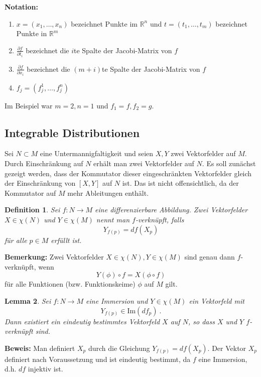\documentclass[12pt,a4paper]{article}
\def\R{\mathbb{R}}
\def\Im{\mathrm{Im}}
\newtheorem{Lemma}{Lemma}[section]
\newtheorem{Definition}[Lemma]{Definition}
\def\proof{\noindent\textbf{Beweis:}\quad}
\begin{document}
{\bf Notation:}
\begin{enumerate}
\item
$x=(x_1,\ldots, x_n)$ bezeichnet Punkte im $\R^n$ und $t=(t_1,\ldots, t_m)$ bezeichnet Punkte in $\R^m$
\item
$\tfrac{\partial f}{\partial t_i} $ bezeichnet die $i$te Spalte der Jacobi-Matrix von $f$
\item
$\tfrac{\partial f}{\partial x_i} $ bezeichnet die $(m+i)$te Spalte der Jacobi-Matrix von $f$
\item
$f_j = (f^1_j,\ldots,f^n_j)$
\end{enumerate}

\bigskip

Im Beispiel war $m=2, n=1$ und $f_1=f, f_2=g$.


\subsection{Integrable Distributionen}

Sei $N \subset M$ eine Untermannigfaltigkeit und seien $X, Y$ zwei Vektorfelder auf $M$. Durch Einschr\"ankung
auf $N$ erh\"alt man zwei Vektorfelder auf $N$. Es soll zun\"achst gezeigt werden, dass der Kommutator dieser
eingeschr\"ankten Vektorfelder gleich der Einschr\"ankung von $[X,Y]$ auf $N$ ist. Das ist nicht offensichtlich,
da der Kommutator auf $M$ mehr Ableitungen enth\"alt.

\bigskip

\begin{Definition}
Sei $f:N\rightarrow M$ eine differenzierbare Abbildung.  Zwei Vektorfelder $X\in \chi(N)$ und $Y\in \chi(M)$
nennt man {\em $f$-verkn\"upft}, falls
$$
Y_{f(p)} = df (X_p)
$$
f\"ur alle $p\in M$ erf\"ullt ist.
\end{Definition}

\bigskip

{\bf Bemerkung:} Zwei Vektorfelder $X \in \chi(N),  Y\in \chi(M)$ sind genau dann $f$-verkn\"upft, wenn
$$
Y(\phi) \circ f = X(\phi \circ f)
$$
f\"ur alle Funktionen (bzw. Funktionskeime) $\phi$ auf $M$ gilt.

\bigskip

\begin{Lemma}
Sei $f: N \rightarrow M $ eine Immersion und $Y\in \chi(M)$ ein Vektorfeld mit
$$
Y_{f(p)} \in \Im (df_p) \ .
$$
Dann existiert ein eindeutig bestimmtes Vektorfeld $X$ auf $N$, so dass $X$ und $Y$
$f$-verkn\"upft sind.
\end{Lemma}
\proof
Man definiert $X_p$ durch die Gleichung $Y_{f(p)}=df (X_p)$. Der Vektor $X_p$ definiert nach
Voraussetzung und ist eindeutig bestimmt, da $f$ eine Immersion, d.h. $df$ injektiv ist.
\end{document}
